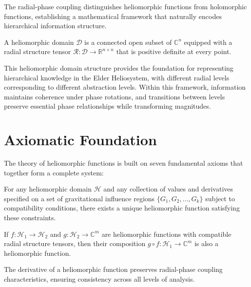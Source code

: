 The radial-phase coupling distinguishes heliomorphic functions from holomorphic functions, establishing a mathematical framework that naturally encodes hierarchical information structure.

\begin{definition}
A heliomorphic domain $\mathcal{D}$ is a connected open subset of $\mathbb{C}^n$ equipped with a radial structure tensor $\mathcal{R}: \mathcal{D} \rightarrow \mathbb{R}^{n \times n}$ that is positive definite at every point.
\end{definition}

This heliomorphic domain structure provides the foundation for representing hierarchical knowledge in the Elder Heliosystem, with different radial levels corresponding to different abstraction levels. Within this framework, information maintains coherence under phase rotations, and transitions between levels preserve essential phase relationships while transforming magnitudes.

\section{Axiomatic Foundation}

The theory of heliomorphic functions is built on seven fundamental axioms that together form a complete system:

\begin{axiom}
For any heliomorphic domain $\mathcal{H}$ and any collection of values and derivatives specified on a set of gravitational influence regions $\{G_1, G_2, \ldots, G_k\}$ subject to compatibility conditions, there exists a unique heliomorphic function satisfying these constraints.
\end{axiom}

\begin{axiom}
If $f: \mathcal{H}_1 \rightarrow \mathcal{H}_2$ and $g: \mathcal{H}_2 \rightarrow \mathbb{C}^m$ are heliomorphic functions with compatible radial structure tensors, then their composition $g \circ f: \mathcal{H}_1 \rightarrow \mathbb{C}^m$ is also a heliomorphic function.
\end{axiom}

\begin{axiom}
The derivative of a heliomorphic function preserves radial-phase coupling characteristics, ensuring consistency across all levels of analysis.
\end{axiom}

